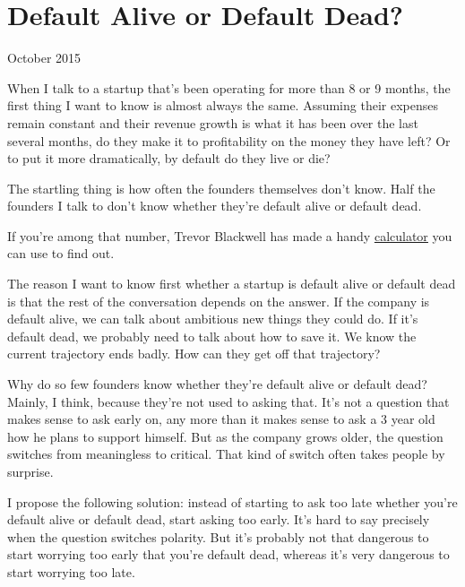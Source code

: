 \chapter{Default Alive or Default Dead?}


            
              
                

October 2015

When I talk to a startup that's been
                  operating for more than 8 or 9 months, the first thing I want
                  to know is almost always the same. Assuming their expenses
                  remain constant and their revenue growth is what it has been
                  over the last several months, do they make it to profitability
                  on the money they have left? Or to put it more dramatically,
                  by default do they live or die?

The startling thing
                  is how often the founders themselves don't know. Half the
                  founders I talk to don't know whether they're default alive or
                  default dead.

If you're among that number, Trevor
                  Blackwell has made a handy
                  \href{http://growth.tlb.org/\#}{\underline{calculator}} you
                  can use to find out.

The reason I want to know
                  first whether a startup is default alive or default dead is
                  that the rest of the conversation depends on the answer. If
                  the company is default alive, we can talk about ambitious new
                  things they could do. If it's default dead, we probably need
                  to talk about how to save it. We know the current trajectory
                  ends badly. How can they get off that trajectory?

Why
                  do so few founders know whether they're default alive or
                  default dead? Mainly, I think, because they're not used to
                  asking that. It's not a question that makes sense to ask early
                  on, any more than it makes sense to ask a 3 year old how he
                  plans to support himself. But as the company grows older, the
                  question switches from meaningless to critical. That kind of
                  switch often takes people by surprise.

I propose
                  the following solution: instead of starting to ask too late
                  whether you're default alive or default dead, start asking too
                  early. It's hard to say precisely when the question switches
                  polarity. But it's probably not that dangerous to start
                  worrying too early that you're default dead, whereas it's very
                  dangerous to start worrying too late.

